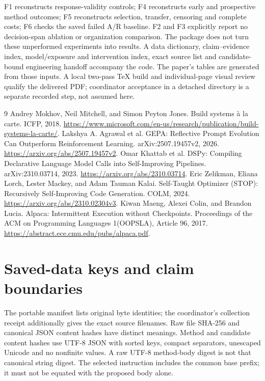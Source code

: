 F1 reconstructs response-validity controls; F4 reconstructs early and prospective
method outcomes; F5 reconstructs selection, transfer, censoring and complete
costs; F6 checks the saved failed A/R baseline. F2 and F3 explicitly report no
decision-span ablation or organization comparison. The package does not turn
these unperformed experiments into results. A data dictionary, claim--evidence
index, model/exposure and intervention index, exact source list and candidate-bound
engineering handoff accompany the code. The paper's tables are generated from
those inputs. A local two-pass TeX build and individual-page visual review
qualify the delivered PDF; coordinator acceptance in a detached directory is
a separate recorded step, not assumed here.

\begin{thebibliography}{9}
Andrey Mokhov, Neil Mitchell, and Simon Peyton Jones.
Build systems \`a la carte. ICFP, 2018.
\url{https://www.microsoft.com/en-us/research/publication/build-systems-la-carte/}.
Lakshya A. Agrawal et al.
GEPA: Reflective Prompt Evolution Can Outperform Reinforcement Learning.
arXiv:2507.19457v2, 2026.
\url{https://arxiv.org/abs/2507.19457v2}.
Omar Khattab et al.
DSPy: Compiling Declarative Language Model Calls into Self-Improving Pipelines.
arXiv:2310.03714, 2023.
\url{https://arxiv.org/abs/2310.03714}.
Eric Zelikman, Eliana Lorch, Lester Mackey, and Adam Tauman Kalai.
Self-Taught Optimizer (STOP): Recursively Self-Improving Code Generation.
COLM, 2024. \url{https://arxiv.org/abs/2310.02304v3}.
Kiwan Maeng, Alexei Colin, and Brandon Lucia.
Alpaca: Intermittent Execution without Checkpoints.
Proceedings of the ACM on Programming Languages 1(OOPSLA), Article 96, 2017.
\url{https://abstract.ece.cmu.edu/pubs/alpaca.pdf}.
\end{thebibliography}

\appendix
\section{Saved-data keys and claim boundaries}
The portable manifest lists original byte identities; the coordinator's
collection receipt additionally gives the exact source filenames. Raw file
SHA-256 and canonical JSON content hashes have distinct meanings. Method and
candidate content hashes use UTF-8 JSON with sorted keys, compact separators,
unescaped Unicode and no nonfinite values. A raw UTF-8 method-body digest is
not that canonical string digest. The selected instruction includes the common
base prefix; it must not be equated with the proposed body alone.

